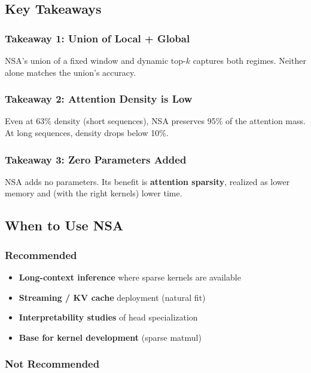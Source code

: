 \subsection{Key Takeaways}

\subsubsection{Takeaway 1: Union of Local + Global}

NSA's union of a fixed window and dynamic top-$k$ captures both regimes. 
Neither alone matches the union's accuracy.

\subsubsection{Takeaway 2: Attention Density is Low}

Even at 63\% density (short sequences), NSA preserves 95\% of the attention 
mass. At long sequences, density drops below 10\%.

\subsubsection{Takeaway 3: Zero Parameters Added}

NSA adds no parameters. Its benefit is \textbf{attention sparsity}, realized as 
lower memory and (with the right kernels) lower time.

\subsection{When to Use NSA}

\subsubsection{Recommended}

\begin{itemize}
\item \textbf{Long-context inference} where sparse kernels are available
\item \textbf{Streaming / KV cache} deployment (natural fit)
\item \textbf{Interpretability studies} of head specialization
\item \textbf{Base for kernel development} (sparse matmul)

\end{itemize}
\subsubsection{Not Recommended}

